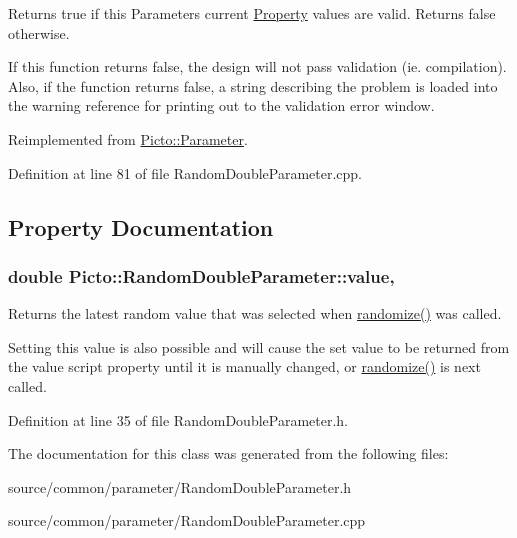 Returns true if this Parameters current \hyperlink{class_picto_1_1_property}{Property} values are valid. Returns false otherwise. 

If this function returns false, the design will not pass validation (ie. compilation). Also, if the function returns false, a string describing the problem is loaded into the warning reference for printing out to the validation error window. 

Reimplemented from \hyperlink{class_picto_1_1_parameter_a3443808da4c3edf26f2c3c3772d95b10}{Picto\-::\-Parameter}.



Definition at line 81 of file Random\-Double\-Parameter.\-cpp.



\subsection{Property Documentation}
\hypertarget{class_picto_1_1_random_double_parameter_a56665a410b8ac41b4b6a983b9f39ef65}{
\subsubsection[{value}]{\setlength{\rightskip}{0pt plus 5cm}double Picto\-::\-Random\-Double\-Parameter\-::value\hspace{0.3cm}{\ttfamily [read]}, {\ttfamily [write]}}}\label{class_picto_1_1_random_double_parameter_a56665a410b8ac41b4b6a983b9f39ef65}


Returns the latest random value that was selected when \hyperlink{class_picto_1_1_random_double_parameter_a8de295a1b08b19b4c413419df42fe7e9}{randomize()} was called. 

Setting this value is also possible and will cause the set value to be returned from the value script property until it is manually changed, or \hyperlink{class_picto_1_1_random_double_parameter_a8de295a1b08b19b4c413419df42fe7e9}{randomize()} is next called. 

Definition at line 35 of file Random\-Double\-Parameter.\-h.



The documentation for this class was generated from the following files\-:\begin{DoxyCompactItemize}
\item 
source/common/parameter/Random\-Double\-Parameter.\-h\item 
source/common/parameter/Random\-Double\-Parameter.\-cpp\end{DoxyCompactItemize}

